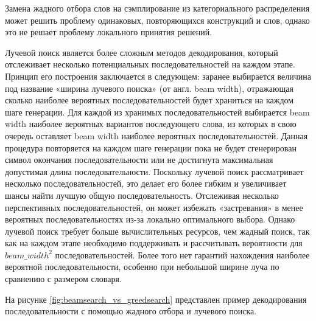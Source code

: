 \documentclass[a4paper,12pt]{extarticle}
\begin{document}
Замена жадного отбора слов на сэмплирование из категориального распределения может решить проблему одинаковых, повторяющихся конструкций и слов, однако это не решает проблему локального принятия решений.

Лучевой поиск является более сложным методов декодирования, который отслеживает несколько потенциальных последовательностей на каждом этапе. Принцип его построения заключается в следующем: заранее выбирается величина под название «ширина лучевого поиска» (от англ. beam width), отражающая сколько наиболее вероятных последовательностей будет храниться на каждом шаге генерации. Для каждой из хранимых последовательностей выбирается beam width наиболее вероятных вариантов последующего слова, из которых в свою очередь оставляет beam width наиболее вероятных последовательностей. Данная процедура повторяется на каждом шаге генерации пока не будет сгенерирован символ окончания последовательности или не достигнута максимальная допустимая длина последовательности. Поскольку лучевой поиск рассматривает несколько последовательностей, это делает его более гибким и увеличивает шансы найти лучшую общую последовательность. Отслеживая несколько перспективных последовательностей, он может избежать «застревания» в менее вероятных последовательностях из-за локально оптимального выбора. Однако лучевой поиск требует больше вычислительных ресурсов, чем жадный поиск, так как на каждом этапе необходимо поддерживать и рассчитывать вероятности для $beam\_width^2$ последовательностей. Более того нет гарантий нахождения наиболее вероятной последовательности, особенно при небольшой ширине луча по сравнению с размером словаря.

На рисунке \ref{fig:beamsearch_vs_greedsearch} представлен пример декодирования последовательности с помощью жадного отбора и лучевого поиска.
\end{document}
